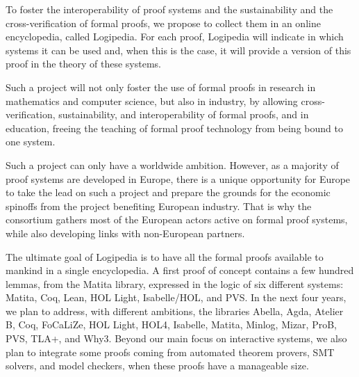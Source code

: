 To foster the interoperability of proof systems and the sustainability
and the cross-verification of formal proofs, we propose to collect
them in an online encyclopedia, called Logipedia.  For each proof,
Logipedia will indicate in which systems it can be used and, when this
is the case, it will provide a version of this proof in the theory of
these systems.

Such a project will not only foster the use of formal proofs in
research in mathematics and computer science, but also in industry, by
allowing cross-verification, sustainability, and interoperability of
formal proofs, and in education, freeing the teaching of formal proof
technology from being bound to one system.

Such a project can only have a worldwide ambition. However, as a
majority of proof systems are developed in Europe, there is a unique
opportunity for Europe to take the lead on such a project and prepare
the grounds for the economic spinoffs from the project benefiting
European industry. That is why the consortium gathers most of the
European actors active on formal proof systems, while also developing
links with non-European partners.

The ultimate goal of Logipedia is to have all the formal proofs
available to mankind in a single encyclopedia.  A first proof of
concept contains a few hundred lemmas, from the Matita library,
expressed in the logic of six different systems: Matita, Coq, Lean,
HOL Light, Isabelle/HOL, and PVS.  In the next four years, we plan to
address, with different ambitions, the libraries Abella, Agda, Atelier
B, Coq, FoCaLiZe, HOL Light, HOL4, Isabelle, Matita, Minlog, Mizar,
ProB, PVS, 
TLA+, and Why3.  Beyond our main focus on interactive systems, we
also plan to integrate some proofs coming from automated theorem
provers, SMT solvers, and model checkers, when these proofs have a
manageable size.


